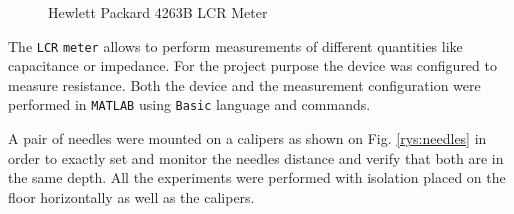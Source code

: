 \documentclass[a4paper, keeplastbox]{jacow}
\def\figurename{Fig.}
\begin{document}
\begin{figure}[H]
	\begin{center}
	\end{center}
	\caption{Hewlett Packard 4263B LCR Meter}
	\label{rys:hewlett}
\end{figure}

The \verb|LCR| \verb|meter| allows to perform measurements of different quantities like capacitance or impedance. For the project purpose the device was configured to measure resistance. Both the device and the measurement configuration were performed in \verb|MATLAB| using \verb|Basic| language and commands.

A pair of needles were mounted on a calipers as shown on \figurename{} \ref{rys:needles} in order to exactly set and monitor the needles distance and verify that both are in the same depth. All the experiments were performed with isolation placed on the floor horizontally as well as the calipers. 
\end{document}
